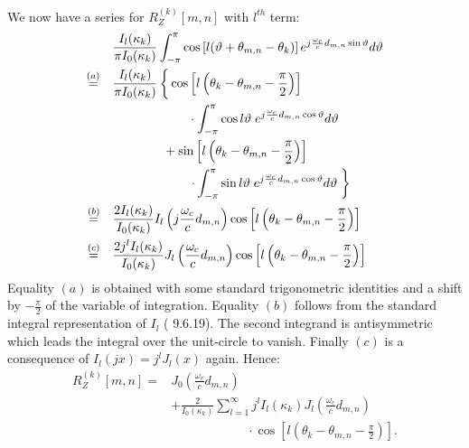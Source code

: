 \documentclass[journal,10pt]{IEEEtran}
\begin{document}
We now have a series for $R_Z^{(k)}[m,n]$ with $l^{th}$ term:
\begin{align*} & \frac{ I_l(\kappa_k)}{\pi I_0(\kappa_k)}\int_{-\pi}^{\pi}\cos\left[l(\vartheta+\theta_{m,n}-\theta_k)\right] e^{j\frac{\omega_c}{c}d_{m,n}\sin\vartheta}d\vartheta \\
\overset{(a)}{=}\quad&\frac{ I_l(\kappa_k)}{\pi I_0(\kappa_k)}
\left\lbrace\vphantom{\int_{-\pi}^{\pi}}\cos\left[l\left(\theta_k-\theta_{m,n}-\frac{\pi}{2}\right)\right]\right.\\ 
&\qquad\qquad\qquad\cdot\int_{-\pi}^{\pi}\cos l\vartheta\; e^{j\frac{\omega_c}{c}d_{m,n}\cos\vartheta}d\vartheta\\
 & \qquad\qquad+\sin\left[l\left(\theta_k-\theta_{m,n}-\frac{\pi}{2}\right)\right]\\
 &\qquad\qquad\qquad\left.\cdot\int_{-\pi}^{\pi}\sin l\vartheta\; e^{j\frac{\omega_c}{c}d_{m,n}\cos\vartheta}d\vartheta\;\right\rbrace\\
\overset{(b)}{=}\quad& \frac{2 I_l(\kappa_k)}{I_0(\kappa_k)}I_l\left(j\frac{\omega_c}{c}d_{m,n}\right)\cos\left[l\left(\theta_k-\theta_{m,n}-\frac{\pi}{2}\right)\right]\\
\overset{(c)}{=}\quad& \frac{ 2j^{l}I_l(\kappa_k)}{I_0(\kappa_k)}J_l\left(\frac{\omega_c}{c}d_{m,n}\right)\cos\left[l\left(\theta_k-\theta_{m,n}-\frac{\pi}{2}\right)\right]
\end{align*}
Equality $(a)$ is obtained with some standard trigonometric identities and a shift by $-\frac{\pi}{2}$ of the variable of integration. Equality $(b)$ follows from the standard integral representation of $I_l$ (\cite{Abramowitz1964} 9.6.19). The second integrand is antisymmetric which leads the integral over the unit-circle to vanish. Finally $(c)$ is a consequence of $I_l(jx)=j^lJ_l(x)$ again.
Hence:
\begin{align*}R_Z^{(k)}[m,n] =& J_0\left(\frac{\omega_c}{c}d_{m,n}\right)\\
&+\frac{2}{I_0(\kappa_k)}\sum_{l=1}^\infty j^{l}I_l(\kappa_k)J_l\left(\frac{\omega_c}{c}d_{m,n}\right)\\
&\qquad\qquad\qquad\cdot\cos\left[l\left(\theta_k-\theta_{m,n}-\frac{\pi}{2}\right)\right].
\end{align*} 
 








\ifCLASSOPTIONcaptionsoff
  \newpage
\fi









\end{document}

